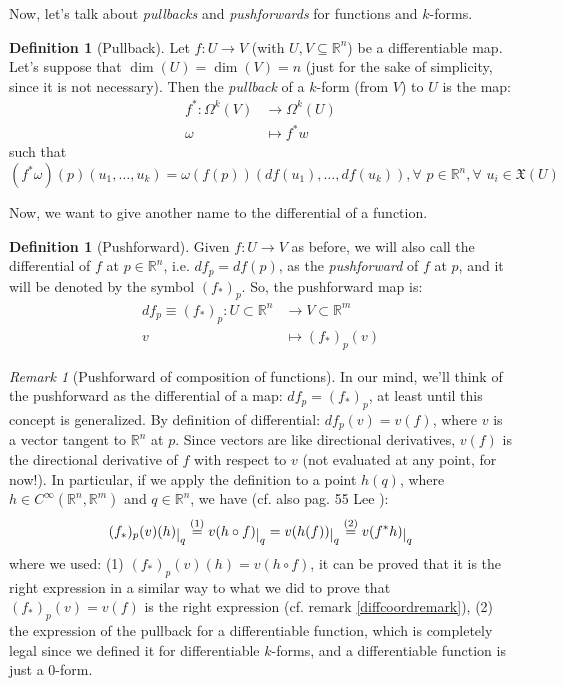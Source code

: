 \documentclass[a4paper,11pt,titlepage, article, oneside]{memoir}
\numberwithin{equation}{section}
\theoremstyle{definition}
\newtheorem{definition}[theorem]{Definition}
\theoremstyle{remark}
\newtheorem{remark}[theorem]{Remark}
\newcommand{\rfield}{\mathbb{R}}
\newcommand{\restrict}[2]{{#1}\raisebox{-.5ex}{$|$}_{#2}}
\begin{document}
Now, let's talk about \textit{pullbacks} and \textit{pushforwards} for functions and $k$-forms.

\begin{definition}[Pullback]
  Let $f \colon U \rightarrow V$ (with $U, V \subseteq \rfield^n$) be a differentiable map. Let's suppose that $\dim(U) = \dim(V) = n$ (just for the sake of simplicity, since it is not necessary). Then the \textit{pullback} of a $k$-form (from $V$) to $U$ is the map:
  \begin{align*} \label{pullbackdef}
    f^* \colon \Omega^k(V) & \rightarrow \Omega^k(U) \\
    \omega & \mapsto f^*w
  \end{align*}
  such that
  \begin{equation*}
    (f^* \omega)(p) (u_1, \ldots, u_k) = \omega (f(p)) (df(u_1), \ldots, df(u_k)), \forall\, \, p \in \rfield^n, \forall \,\, u_i \in \mathfrak{X}(U)
  \end{equation*}
\end{definition}

Now, we want to give another name to the differential of a function.
\begin{definition}[Pushforward]
  Given $f \colon U \rightarrow V$ as before, we will also call the differential of $f$ at $p \in \rfield^n$, i.e. $df_p = df(p)$, as the \textit{pushforward} of $f$ at $p$, and it will be denoted by the symbol $(f_*)_p$.
  So, the pushforward map is:
\begin{align*}
  df_p \equiv (f_*)_p \colon U \subset \rfield^n &\rightarrow V \subset \rfield^m \\
    v & \mapsto (f_*)_p (v)
\end{align*}
\end{definition}

\begin{remarkbox}\begin{remark}[Pushforward of composition of functions]
In our mind, we'll think of the pushforward as the differential of a map: $df_p = (f_*)_p$, at least until this concept is generalized. 
By definition of differential: $df_p(v) = v(f)$, where $v$ is a vector tangent to $\rfield^n$ at $p$. Since vectors are like directional derivatives, $v(f)$ is the directional derivative of $f$ with respect to $v$ (not evaluated at any point, for now!). In particular, if we apply the definition to a point $h(q)$, where $h \in C^{\infty}(\rfield^n, \rfield^m)$ and $q \in \rfield^n$, we have (cf. also pag. 55 Lee ):
$$\restrict{(f_*)_p (v)(h)}{q} \overset{(1)}{=} \restrict{v(h \circ f)}{q}  = \restrict{v(h(f))}{q} \overset{(2)}{=} \restrict{v (f^* h) }{q}$$
where we used: (1) $(f_*)_p (v)(h)  = v(h \circ f)$, it can be proved that it is the right expression in a similar way to what we did to prove that $(f_*)_p (v)= v(f)$ is the right expression (cf. remark \ref{diffcoordremark}), (2) the expression of the pullback for a differentiable function, which is completely legal since we defined it for differentiable $k$-forms, and a differentiable function is just a 0-form.
\end{remark}\end{remarkbox}
\end{document}
